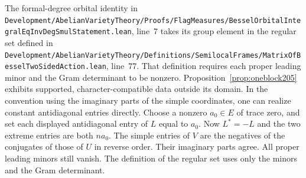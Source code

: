 \documentclass[a4paper,11pt]{article}
\theoremstyle{definition}
\theoremstyle{remark}
\newcommand{\srcloc}[2]{{\small\nolinkurl{#1.lean}}, line~#2}
\numberwithin{equation}{section}
\begin{document}
The formal-degree orbital identity in
\srcloc{Development/AbelianVarietyTheory/Proofs/FlagMeasures/BesselOrbitalIntegralEqInvDegSmulStatement}{7}
takes its group element in the regular set defined in
\srcloc{Development/AbelianVarietyTheory/Definitions/SemilocalFrames/MatrixOfBesselTwoSidedAction}{77}.
That definition requires each proper leading minor and the Gram
determinant to be nonzero. Proposition~\ref{prop:oneblock205}
exhibits supported, character-compatible data outside its domain.
In the convention using the
imaginary parts of the simple coordinates, one can realize constant
antidiagonal entries directly. Choose a nonzero \(a_0\in E\) of
trace zero, and set each displayed antidiagonal entry of \(L\) equal
to \(a_0\). Now \(L^*=-L\) and the two extreme entries are both
\(na_0\). The simple entries of \(V\) are the negatives of the
conjugates of those of \(U\) in reverse order. Their imaginary
parts agree. All proper leading minors still vanish. The definition
of the regular set uses only the minors and the Gram determinant.
\end{document}
